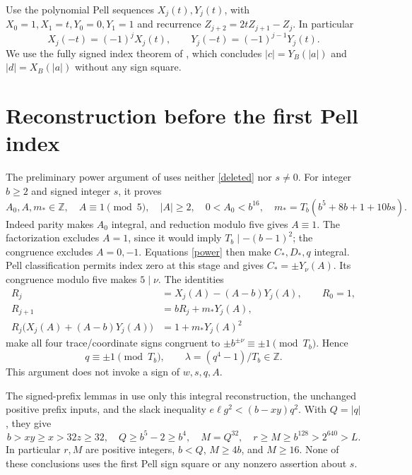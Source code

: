 \documentclass[11pt]{article}
\newcommand{\Z}{\mathbb Z}\newcommand{\Q}{\mathbb Q}
\begin{document}
Use the polynomial Pell sequences \(X_j(t),Y_j(t)\), with
\(X_0=1,X_1=t,Y_0=0,Y_1=1\) and recurrence
\(Z_{j+2}=2tZ_{j+1}-Z_j\). In particular
\[
 X_j(-t)=(-1)^jX_j(t),\qquad
 Y_j(-t)=(-1)^{j-1}Y_j(t).
\]
We use the fully signed index theorem of \cite{CRT}, which concludes
\(\lvert c\rvert=Y_B(\lvert a\rvert)\) and
\(\lvert d\rvert=X_B(\lvert a\rvert)\) without any sign square.

\section{Reconstruction before the first Pell index}

The preliminary power argument of \cite{Power} uses neither
\eqref{deleted} nor \(s\ne0\). For integer \(b\ge2\) and signed
integer \(s\), it proves
\[
 A_0,A,m_*\in\Z,\quad A\equiv1\pmod5,\quad |A|\ge2,
 \quad 0<A_0<b^{16},
 \quad m_*=T_b(b^5+8b+1+10bs).
\]
Indeed parity makes \(A_0\) integral, and reduction modulo five
gives \(A\equiv1\). The factorization excludes \(A=1\), since
it would imply \(T_b\mid-(b-1)^2\); the congruence excludes
\(A=0,-1\). Equations \eqref{power} then make \(C_*,D_*,q\)
integral. Pell classification permits index zero at this stage and
gives \(C_*=\pm Y_\nu(A)\). Its congruence modulo five makes
\(5\mid\nu\). The identities
\begin{equation}\label{power-rec}
 \begin{split}
 R_j&=X_j(A)-(A-b)Y_j(A),\qquad R_0=1,\\
 R_{j+1}&=bR_j+m_*Y_j(A),\\
 R_j\bigl(X_j(A)+(A-b)Y_j(A)\bigr)&=1+m_*Y_j(A)^2
 \end{split}
\end{equation}
make all four trace/coordinate signs congruent to
\(\pm b^{\pm\nu}\equiv\pm1\pmod{T_b}\). Hence
\[
 q\equiv\pm1\pmod{T_b},\qquad
 \lambda=(q^4-1)/T_b\in\Z.
\]
This argument does not invoke a sign of \(w,s,q,A\).

The signed-prefix lemmas in \cite{SignedQ} use only this integral
reconstruction, the unchanged positive prefix inputs, and the slack
inequality \(e\ell g^2<(b-xy)q^2\). With \(Q=|q|\), they give
\begin{equation}\label{prefix}
 b>xy\ge x>32z\ge32,\quad Q\ge b^5-2\ge b^4,
 \quad M=Q^{32},\quad r\ge M\ge b^{128}>2^{640}>L.
\end{equation}
In particular \(r,M\) are positive integers, \(b<Q\),
\(M\ge4b\), and \(M\ge16\). None of these conclusions uses
the first Pell sign square or any nonzero assertion about \(s\).
\end{document}
